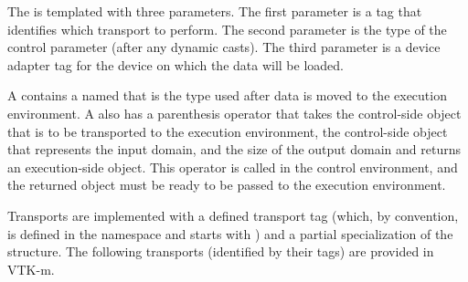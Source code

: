 The   is templated with three
parameters. The first parameter is a tag that identifies which transport to
perform. The second parameter is the type of the control parameter (after any
dynamic casts). The third parameter is a device adapter tag for the device
on which the data will be loaded.

A  contains a  named  that is the type used after data is moved to the execution environment.
A  also has a  parenthesis operator that takes the control-side object that is to be transported to the execution environment, the control-side object that represents the input domain, and the size of the output domain and returns an execution-side object.
This operator is called in the control environment, and the returned object must be ready to be passed to the execution environment.

Transports are implemented with a defined transport tag (which, by
convention, is defined in the \vtkmcontarg{} namespace and starts with
) and a partial specialization of the
 structure. The following transports (identified by
their tags) are provided in VTK-m.

